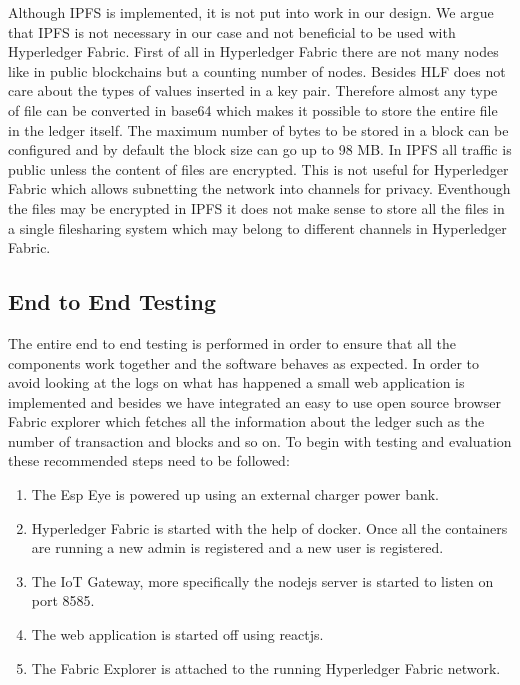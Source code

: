 Although IPFS is implemented, it is not put into work in our design. We argue that IPFS is not necessary in our case and not beneficial to be used with Hyperledger Fabric. First of all in Hyperledger Fabric there are not many nodes like in public blockchains but a counting number of nodes. Besides HLF does not care about the types of values inserted in a key pair. Therefore almost any type of file can be converted in base64 which makes it possible to store the entire file in the ledger itself. The maximum number of bytes to be stored in a block can be configured and by default the block size can go up to 98 MB.  In IPFS all traffic is public unless the content of files are encrypted. This is not useful for Hyperledger Fabric which allows subnetting the network into channels for privacy. Eventhough the files may be encrypted in IPFS it does not make sense to store all the files in a single filesharing system which may belong to different channels in Hyperledger Fabric. 


\subsection{End to End Testing}

The entire end to end testing is performed in order to ensure that all the components work together and the software behaves as expected. In order to avoid looking at the logs on what has happened a small web application is implemented and besides we have integrated an easy to use open source browser Fabric explorer which fetches all the information about the ledger such as the number of transaction and blocks and so on. 
To begin with testing and evaluation these recommended steps need to be followed: 

\begin{enumerate}
    \item The Esp Eye is powered up using an external charger power bank. 
    \item Hyperledger Fabric is started with the help of docker. Once all the containers are running a new admin is registered and a new user is registered.  
    \item The IoT Gateway, more specifically the nodejs server is started to listen on port 8585. 
    \item The web application is started off using reactjs.
    \item The Fabric Explorer is attached to the running Hyperledger Fabric network. 
\end{enumerate}

